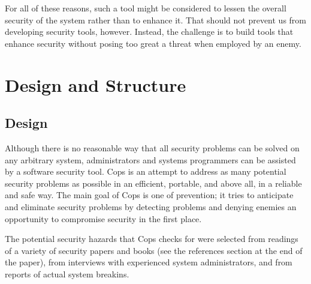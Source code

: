 For all of these reasons, such a tool might be considered to lessen the 
overall security of the system rather than to enhance it.  That should
not prevent us from developing security tools, however.  Instead, the
challenge is to build tools that enhance security without posing too
great a threat when employed by an enemy.

\section{Design and Structure}
\subsection{Design}

Although there is no reasonable way that all security
problems can be solved on any arbitrary  system,
administrators and systems programmers
can be assisted by a software security tool.
{\sc Cops} is an attempt to address as many potential security
problems as possible in an efficient, portable, and above all, in a
reliable and safe way.  The main goal of {\sc Cops} is one of prevention;
it tries to anticipate and eliminate security problems by
detecting problems and denying enemies an opportunity to
compromise security in the first place.

The potential security hazards that {\sc Cops} checks for were selected
from readings of a variety of security papers and books (see the
references section at the end of the paper), from
interviews with experienced system administrators, and
from reports of actual system breakins.

